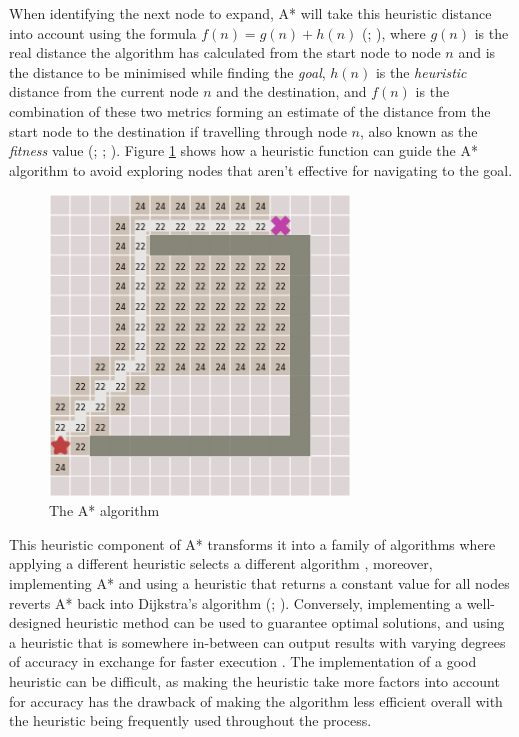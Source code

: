 \documentclass[11pt, a4paper]{report}
\begin{document}
When identifying the next node to expand, A* will take this heuristic distance into account using the formula $f(n) = g(n) + h(n)$ (\cite[102]{hart1968formal}; \cite[95]{russell2016artificial}), where $g(n)$ is the real distance the algorithm has calculated from the start node to node $n$ and is the distance to be minimised while finding the \emph{goal}, $h(n)$ is the \emph{heuristic} distance from the current node $n$ and the destination, and $f(n)$ is the combination of these two metrics forming an estimate of the distance from the start node to the destination if travelling through node $n$, also known as the \emph{fitness} value (\cite{hart1968formal}; \cite{millington2019ai}; \cite[64]{graham2003pathfinding}). Figure \ref{fig:aStarAlgorithm} shows how a heuristic function can guide the A* algorithm to avoid exploring nodes that aren't effective for navigating to the goal.

\begin{figure}[!h]
  \centering
  \includegraphics[width=8cm]{img/astar_algorithm.png}
  \caption{The A* algorithm \parencite{red2014introduction}}
  \label{fig:aStarAlgorithm}
\end{figure}

This heuristic component of A* transforms it into a family of algorithms where applying a different heuristic selects a different algorithm \parencite[107]{hart1968formal}, moreover, implementing A* and using a heuristic that returns a constant value for all nodes reverts A* back into Dijkstra's algorithm (\cite[10]{lester2005pathfinding}; \cite[237]{millington2019ai}). Conversely, implementing a well-designed heuristic method can be used to guarantee optimal solutions, and using a heuristic that is somewhere in-between can output results with varying degrees of accuracy in exchange for faster execution \parencite[219]{millington2019ai}.  The implementation of a good heuristic can be difficult, as making the heuristic take more factors into account for accuracy has the drawback of making the algorithm less efficient overall with the heuristic being frequently used throughout the process.
\end{document}
